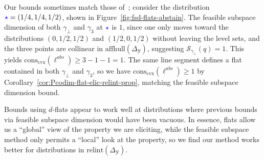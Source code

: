 \documentclass{article} %
\newcommand{\simplex}{\Delta_\Y}
\newcommand{\relint}[1]{\mathrm{relint}(#1)}
\newcommand{\conscvx}{\mathrm{cons}_\mathrm{cvx}}
\newcommand{\affhull}{\mathrm{affhull}}
\newcommand{\Sc}{\mathcal{S}}  %
\newcommand{\Y}{\mathcal{Y}}
\begin{document}
Our bounds sometimes match those of~\citep{ramaswamy2016convex}; consider the distribution ${\color{blue}\star} = (1/4, 1/4, 1/2)$, shown in Figure~\ref{fig:fsd-flats-abstain}.
The feasible subspace dimension of both $\gamma_\bot$ and $\gamma_3$ at ${\color{blue}\star}$ is $1$, since one only moves toward the distributions $(0,1/2, 1/2)$ and $(1/2, 0, 1/2)$ without leaving the level sets, and the three points are collinear in $\affhull(\simplex)$, suggesting $\Sc_{\gamma_\bot}(q) = 1$.  
This yields $\conscvx(\ell^{abs}) \geq 3 - 1- 1 = 1$.
The same line segment defines a flat contained in both $\gamma_\bot$ and $\gamma_3$, so we have $\conscvx(\ell^{abs}) \geq 1$ by Corollary~\ref{cor:Pcodim-flat-elic-relint-prop}, matching the feasible subspace dimension bound.

Bounds using $d$-flats appear to work well at distributions where previous bounds via feasible subspace dimension would have been vacuous.
In essence, flats allow us a ``global'' view of the property we are eliciting, while the feasible subspace method only permits a ``local'' look at the property, so we find our method works better for distributions in $\relint\simplex$.


\end{document}
